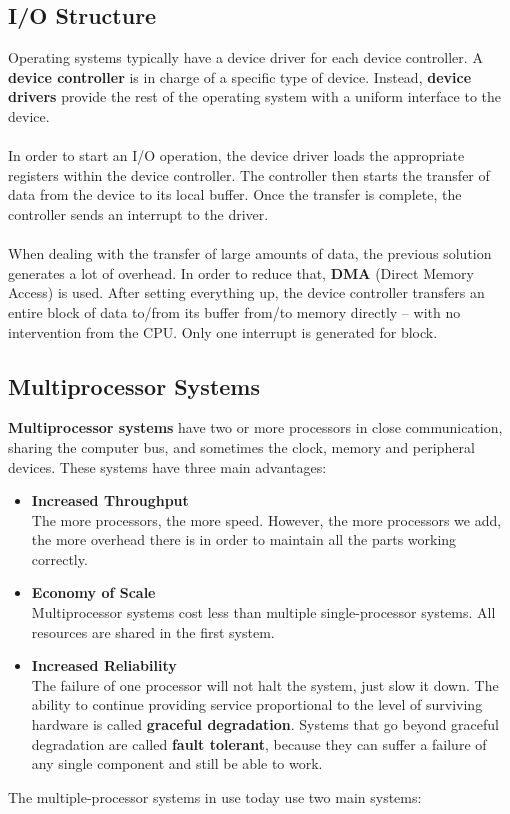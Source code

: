 \documentclass{article}
\begin{document}
\subsection{I/O Structure}
Operating systems typically have a device driver for each device controller. A \textbf{device controller} is in charge of a specific type of device. Instead, \textbf{device drivers} provide the rest of the operating system with a uniform interface to the device. \\ \\
In order to start an I/O operation, the device driver loads the appropriate registers within the device controller. The controller then starts the transfer of data from the device to its local buffer. Once the transfer is complete, the controller sends an interrupt to the driver. \\ \\
When dealing with the transfer of large amounts of data, the previous solution generates a lot of overhead. In order to reduce that, \textbf{DMA} (Direct Memory Access) is used. After setting everything up, the device controller transfers an entire block of data to/from its buffer from/to memory directly -- with no intervention from the CPU. Only one interrupt is generated for block.

\subsection{Multiprocessor Systems}
\textbf{Multiprocessor systems} have two or more processors in close communication, sharing the computer bus, and sometimes the clock, memory and peripheral devices. These systems have three main advantages:

\begin{itemize}
	\item \textbf{Increased Throughput}
	\vspace{.2cm} \\
	The more processors, the more speed. However, the more processors we add, the more overhead there is in order to maintain all the parts working correctly.
	
	\item \textbf{Economy of Scale}
	\vspace{.2cm} \\
	Multiprocessor systems cost less than multiple single-processor systems. All resources are shared in the first system.
	
	\item \textbf{Increased Reliability}
	\vspace{.2cm} \\
	The failure of one processor will not halt the system, just slow it down. The ability to continue providing service proportional to the level of surviving hardware is called \textbf{graceful degradation}. Systems that go beyond graceful degradation are called \textbf{fault tolerant}, because they can suffer a failure of any single component and still be able to work.
\end{itemize}
The multiple-processor systems in use today use two main systems:
\end{document}

